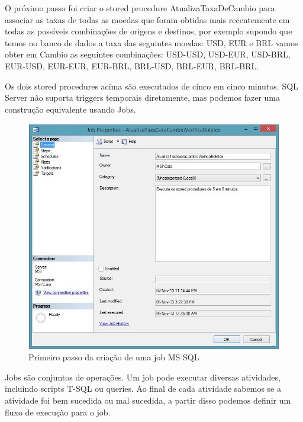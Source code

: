 \documentclass[conference]{IEEEtran}
\begin{document}
  	O próximo passo foi criar o stored procedure AtualizaTaxaDeCambio para associar as taxas de todas as moedas que foram obtidas mais recentemente em todas as possíveis combinações de origens e destinos, por exemplo supondo que temos no banco de dados a taxa das seguintes moedas: USD, EUR e BRL vamos obter em Cambio as seguintes combinações: USD-USD, USD-EUR, USD-BRL, EUR-USD, EUR-EUR, EUR-BRL, BRL-USD, BRL-EUR, BRL-BRL.

  	Os dois stored procedures acima são executados de cinco em cinco minutos. SQL Server não suporta triggers temporais diretamente, mas podemos fazer uma construção equivalente usando Jobs. 

    \begin{figure}[!t]
      \centering
  	  \includegraphics[scale=0.45]{img/job1.jpg}
      \caption{Primeiro passo da criação de uma job MS SQL}
    \end{figure}

  	Jobs são conjuntos de operações. Um job pode executar diversas atividades, incluindo scripts T-SQL ou queries. Ao final de cada atividade sabemos se a atividade foi bem sucedida ou mal sucedida, a partir disso podemos definir um fluxo de execução para o job.
  	
\end{document}
